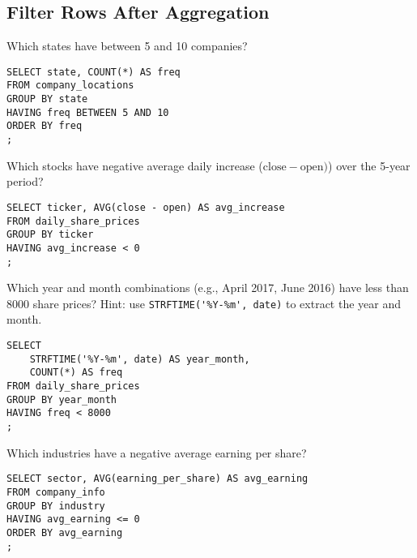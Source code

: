 \documentclass[10pt]{exam}
\begin{document}
\begin{questions}
\subsection*{Filter Rows After Aggregation}

\question Which states have between 5 and 10 companies?

\begin{solution}
\begin{lstlisting}
SELECT state, COUNT(*) AS freq
FROM company_locations
GROUP BY state
HAVING freq BETWEEN 5 AND 10
ORDER BY freq
;
\end{lstlisting}
\end{solution}


\question Which stocks have negative average daily increase ($\textrm{close}
- \textrm{open})$) over the 5-year period?

\begin{solution}
\begin{lstlisting}
SELECT ticker, AVG(close - open) AS avg_increase
FROM daily_share_prices
GROUP BY ticker
HAVING avg_increase < 0
;
\end{lstlisting}
\end{solution}


\question Which year and month combinations (e.g., April 2017, June 2016) have
less than 8000 share prices? Hint: use \lstinline{STRFTIME('%Y-%m', date)} to
extract the year and month.

\begin{solution}
\begin{lstlisting}
SELECT
	STRFTIME('%Y-%m', date) AS year_month,
	COUNT(*) AS freq
FROM daily_share_prices
GROUP BY year_month
HAVING freq < 8000
;
\end{lstlisting}
\end{solution}


\question Which industries have a negative average earning per share?

\begin{solution}
\begin{lstlisting}
SELECT sector, AVG(earning_per_share) AS avg_earning
FROM company_info
GROUP BY industry
HAVING avg_earning <= 0
ORDER BY avg_earning
;
\end{lstlisting}
\end{solution}



\end{questions}

\clearpage
\end{document}
